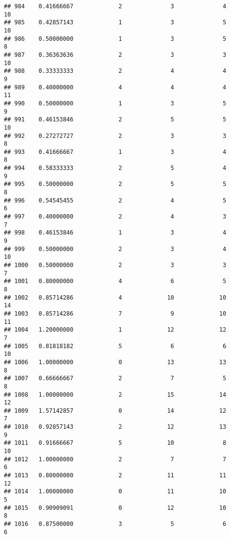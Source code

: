 \documentclass[
]{article}
\begin{document}
\begin{verbatim}
## 984    0.41666667             2              3              4             10
## 985    0.42857143             1              3              5             10
## 986    0.50000000             1              3              5              8
## 987    0.36363636             2              3              3             10
## 988    0.33333333             2              4              4              9
## 989    0.40000000             4              4              4             11
## 990    0.50000000             1              3              5              9
## 991    0.46153846             2              5              5             10
## 992    0.27272727             2              3              3              8
## 993    0.41666667             1              3              4              8
## 994    0.58333333             2              5              4              9
## 995    0.50000000             2              5              5              8
## 996    0.54545455             2              4              5              6
## 997    0.40000000             2              4              3              7
## 998    0.46153846             1              3              4              9
## 999    0.50000000             2              3              4             10
## 1000   0.50000000             2              3              3              7
## 1001   0.80000000             4              6              5              8
## 1002   0.85714286             4             10             10             14
## 1003   0.85714286             7              9             10             11
## 1004   1.20000000             1             12             12              7
## 1005   0.81818182             5              6              6             10
## 1006   1.00000000             0             13             13              8
## 1007   0.66666667             2              7              5              8
## 1008   1.00000000             2             15             14             12
## 1009   1.57142857             0             14             12              7
## 1010   0.92857143             2             12             13              9
## 1011   0.91666667             5             10              8             10
## 1012   1.00000000             2              7              7              6
## 1013   0.80000000             2             11             11             12
## 1014   1.00000000             0             11             10              5
## 1015   0.90909091             0             12             10              8
## 1016   0.87500000             3              5              6              6

\end{verbatim}
\end{document}
